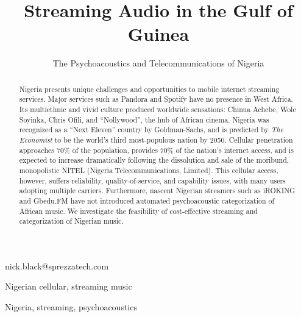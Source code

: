 \documentclass[]{sigplanconf}
\begin{document}

\title{Streaming Audio in the Gulf of Guinea}
\subtitle{The Psychoacoustics and Telecommunications of Nigeria}

           {nick.black@sprezzatech.com}

\maketitle

\begin{abstract}
Nigeria presents unique challenges and opportunities to mobile internet streaming
services. Major services such as Pandora\cite{pandoracountries} and
Spotify\cite{spotifycountries} have no presence in West Africa. Its multiethnic
and vivid culture produced worldwide sensations: Chinua Achebe, Wole Soyinka,
Chris Ofili, and ``Nollywood'', the hub of African cinema. Nigeria
was recognized as a ``Next Eleven'' country by Goldman-Sachs\cite{n11},
and is predicted by \textit{The Economist} to be the world's third most-populous
nation by 2050\cite{economist}. Cellular penetration approaches 70\% of the population\cite{nigeriamobile},
provides 70\% of the nation's internet access, and is expected to increase
dramatically following the dissolution and sale of the moribund, monopolistic
NITEL (Nigeria Telecommunications, Limited)\cite{reutersnitel}. This cellular access,
however, suffers reliability, quality-of-service, and capability issues, with
many users adopting multiple carriers\cite{reuterssims}. Furthermore, nascent
Nigerian streamers such as iROKING and Gbedu.FM have not introduced 
automated psychoacoustic categorization of African music. We investigate the
feasibility of cost-effective streaming and categorization of Nigerian music.
\end{abstract}


\terms
Nigerian cellular, streaming music

\keywords
Nigeria, streaming, psychoacoustics
\end{document}
